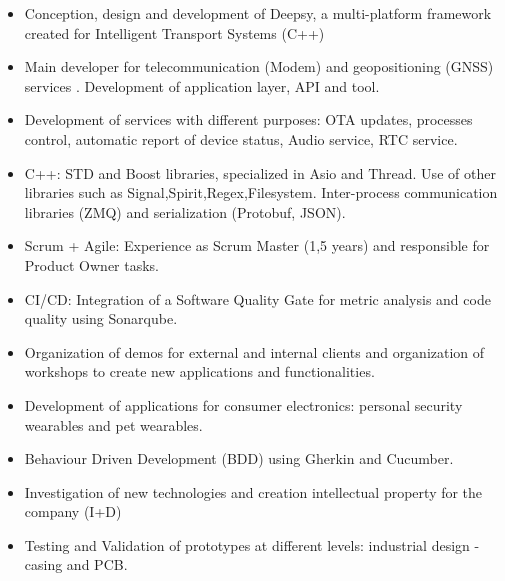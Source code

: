 \documentclass[10pt,a4paper,normalphoto,hidelinks]{altacv}
\begin{document}
\begin{paracol}{2}


\begin{itemize}
\item Conception, design and development of Deepsy, a multi-platform framework created for Intelligent Transport Systems (C++)
\item Main developer for telecommunication (Modem) and geopositioning (GNSS) services . Development of application layer, API and tool.  
\item Development of services with different purposes: OTA updates, processes control, automatic report of device status, Audio service, RTC service. 

\item C++: STD and Boost libraries, specialized in Asio and Thread. Use of other libraries such as Signal,Spirit,Regex,Filesystem. Inter-process communication libraries (ZMQ) and serialization (Protobuf, JSON).
\item Scrum + Agile: Experience as Scrum Master (1,5 years) and responsible for Product Owner tasks. 
\item CI/CD: Integration of a Software Quality Gate for metric analysis and code quality using Sonarqube.
\item Organization of demos for external and internal clients and organization of workshops to create new applications and functionalities. 

\end{itemize}

\divider

\begin{itemize}
\item Development of applications for consumer electronics: personal security wearables and pet wearables.
\item Behaviour Driven Development (BDD) using Gherkin and Cucumber. 

\item Investigation of new technologies and creation intellectual property for the company (I+D)
\item Testing and Validation of prototypes at different levels: industrial design - casing and PCB. 
\end{itemize}



\end{paracol}
\end{document}
